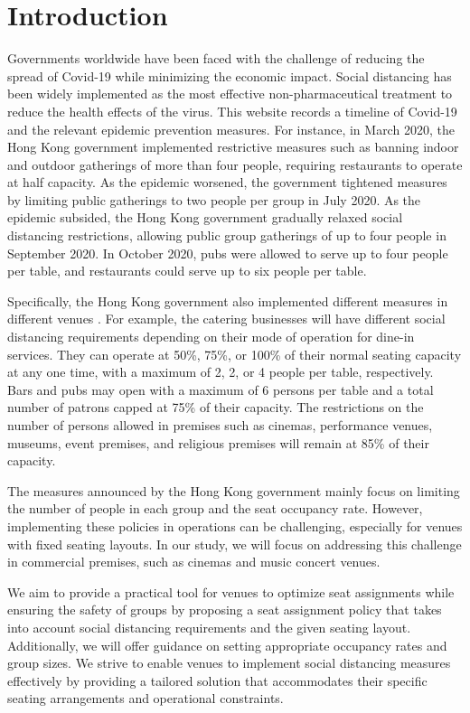\section{Introduction}
Governments worldwide have been faced with the challenge of reducing the spread of Covid-19 while minimizing the economic impact. Social distancing has been widely implemented as the most effective non-pharmaceutical treatment to reduce the health effects of the virus. 
This website records a timeline of Covid-19 and the relevant epidemic prevention measures\cite{Covid19Timeline}. For instance, in March 2020, the Hong Kong government implemented restrictive measures such as banning indoor and outdoor gatherings of more than four people, requiring restaurants to operate at half capacity. As the epidemic worsened, the government tightened measures by limiting public gatherings to two people per group in July 2020. As the epidemic subsided, the Hong Kong government gradually relaxed social distancing restrictions, allowing public group gatherings of up to four people in September 2020. In October 2020, pubs were allowed to serve up to four people per table, and restaurants could serve up to six people per table. 

Specifically, the Hong Kong government also implemented different measures in different venues \cite{Gov202209}. For example, the catering businesses will have different social distancing requirements depending on their mode of operation for dine-in services. They can operate at 50\%, 75\%, or 100\% of their normal seating capacity at any one time, with a maximum of 2, 2, or 4 people per table, respectively. Bars and pubs may open with a maximum of 6 persons per table and a total number of patrons capped at 75\% of their capacity. The restrictions on the number of persons allowed in premises such as cinemas, performance venues, museums, event premises, and religious premises will remain at 85\% of their capacity.

The measures announced by the Hong Kong government mainly focus on limiting the number of people in each group and the seat occupancy rate. However, implementing these policies in operations can be challenging, especially for venues with fixed seating layouts. In our study, we will focus on addressing this challenge in commercial premises, such as cinemas and music concert venues.

We aim to provide a practical tool for venues to optimize seat assignments while ensuring the safety of groups by proposing a seat assignment policy that takes into account social distancing requirements and the given seating layout. Additionally, we will offer guidance on setting appropriate occupancy rates and group sizes. We strive to enable venues to implement social distancing measures effectively by providing a tailored solution that accommodates their specific seating arrangements and operational constraints.

